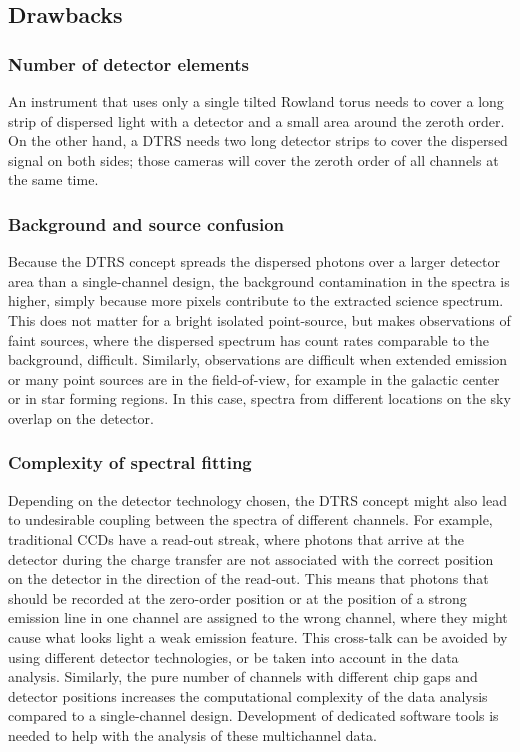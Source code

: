 \documentclass[linenumbers]{aastex631}
\begin{document}
\subsection{Drawbacks}
\subsubsection{Number of detector elements}
An instrument that uses only a single tilted Rowland torus needs to cover a long strip of dispersed light with a detector and a small area around the zeroth order. On the other hand, a DTRS needs two long detector strips to cover the dispersed signal on both sides; those cameras will cover the zeroth order of all channels at the same time.

\subsubsection{Background and source confusion}
Because the DTRS concept spreads the dispersed photons over a larger detector area than a single-channel design, the background contamination in the spectra is higher, simply because more pixels contribute to the extracted science spectrum. This does not matter for a bright isolated point-source, but makes observations of faint sources, where the dispersed spectrum has count rates comparable to the background, difficult. Similarly, observations are difficult when extended emission or many point sources are in the field-of-view, for example in the galactic center or in star forming regions. In this case, spectra from different locations on the sky overlap on the detector.

\subsubsection{Complexity of spectral fitting}
Depending on the detector technology chosen, the DTRS concept might also lead to undesirable coupling between the spectra of different channels. For example, traditional CCDs have a read-out streak, where photons that arrive at the detector during the charge transfer are not associated with the correct position on the detector in the direction of the read-out. This means that photons that should be recorded at the zero-order position or at the position of a strong emission line in one channel are assigned to the wrong channel, where they might cause what looks light a weak emission feature. This cross-talk can be avoided by using different detector technologies, or be taken into account in the data analysis. Similarly, the pure number of channels with different chip gaps and detector positions increases the computational complexity of the data analysis compared to a single-channel design. Development of dedicated software tools is needed to help with the analysis of these multichannel data.
\end{document}
